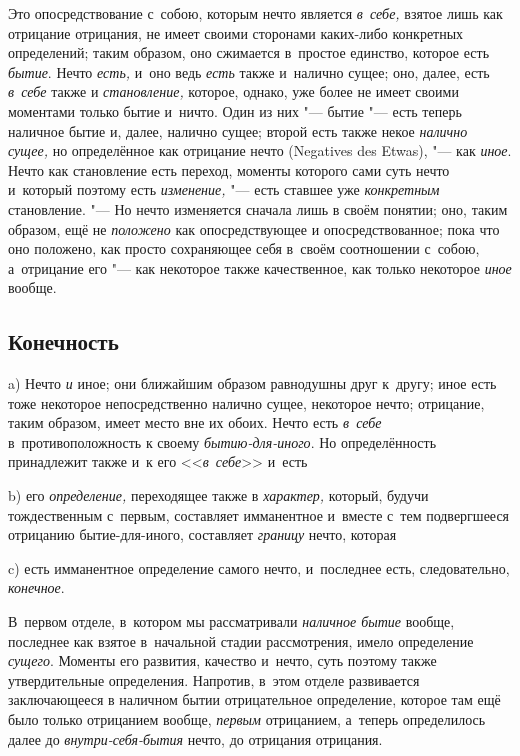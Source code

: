 Это опосредствование с~собою, которым нечто является {\em в~себе,} взятое лишь
как отрицание отрицания, не имеет своими сторонами каких-либо конкретных
определений; таким образом, оно сжимается в~простое единство, которое есть
{\em бытие}. Нечто {\em есть,} и~оно ведь {\em есть} также и~налично сущее;
оно, далее, есть {\em в~себе} также и {\em становление,} которое, однако, уже
более не имеет своими моментами только бытие и~ничто. Один из них "--- бытие
"--- есть теперь наличное бытие и, далее, налично сущее; второй есть также
некое {\em налично сущее,} но определённое как отрицание нечто (Nega\-tives des
Etwas), "--- как {\em иное}. Нечто как становление есть переход, моменты
которого сами суть нечто и~который поэтому есть {\em изменение,} "--- есть
ставшее уже {\em конкретным} становление. "--- Но нечто изменяется сначала лишь
в своём понятии; оно, таким образом, ещё не {\em положено} как опосредствующее
и опосредствованное; пока что оно положено, как просто сохраняющее себя в~своём
соотношении с~собою, а~отрицание его "--- как некоторое также качественное, как
только некоторое {\em иное} вообще.

\subsection{Конечность}

a) Нечто {\em и} иное; они ближайшим образом равнодушны друг к~другу; иное есть
тоже некоторое непосредственно налично сущее, некоторое нечто; отрицание, таким
образом, имеет место вне их обоих. Нечто есть {\em в~себе} в~противоположность
к своему {\em бытию-для-иного}. Но определённость принадлежит также и~к его
<<{\em в~себе}>> и~есть

b) его {\em определение,} переходящее также в {\em характер,} который, будучи
тождественным с~первым, составляет имманентное и~вместе с~тем подвергшееся
отрицанию бытие-для-иного, составляет {\em границу} нечто, которая

c) есть имманентное определение самого нечто, и~последнее есть,
следовательно, {\em конечное}.

В~первом отделе, в~котором мы рассматривали {\em наличное бытие} вообще,
последнее как взятое в~начальной стадии рассмотрения, имело определение
{\em сущего}. Моменты его развития, качество и~нечто, суть поэтому также
утвердительные определения. Напротив, в~этом отделе развивается заключающееся
в наличном бытии отрицательное определение, которое там ещё было только
отрицанием вообще, {\em первым} отрицанием, а~теперь определилось далее до
{\em внутри-себя-бытия} нечто, до отрицания отрицания.


